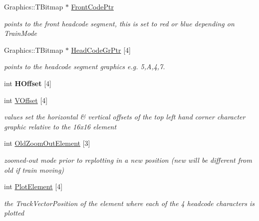 \begin{DoxyCompactItemize}
Graphics\+::\+T\+Bitmap $\ast$ \mbox{\hyperlink{class_t_train_a4ee3cdc7a3602f92a96084f8818b9bd3}{Front\+Code\+Ptr}}
\begin{DoxyCompactList}\small\item\em points to the front headcode segment, this is set to red or blue depending on Train\+Mode \end{DoxyCompactList}\item 
\mbox{\label{class_t_train_ac19e1d8b5171bace341f951bac1031e1}} 
Graphics\+::\+T\+Bitmap $\ast$ \mbox{\hyperlink{class_t_train_ac19e1d8b5171bace341f951bac1031e1}{Head\+Code\+Gr\+Ptr}} \mbox{[}4\mbox{]}
\begin{DoxyCompactList}\small\item\em points to the headcode segment graphics e.\+g. 5,A,4,7. \end{DoxyCompactList}\item 
\mbox{\label{class_t_train_a5b5409585a4af5224f1d91be6a405503}} 
int {\bfseries H\+Offset} \mbox{[}4\mbox{]}
\item 
int \mbox{\hyperlink{class_t_train_a4c8b153a620229a3d9cc54f64ffa5f4a}{V\+Offset}} \mbox{[}4\mbox{]}
\begin{DoxyCompactList}\small\item\em values set the horizontal \& vertical offsets of the top left hand corner character graphic relative to the 16x16 element \end{DoxyCompactList}\item 
int \mbox{\hyperlink{class_t_train_a29c7350be73eb11a6c018a4bc8f8099a}{Old\+Zoom\+Out\+Element}} \mbox{[}3\mbox{]}
\begin{DoxyCompactList}\small\item\em zoomed-\/out mode prior to replotting in a new position (new will be different from old if train moving) \end{DoxyCompactList}\item 
\mbox{\label{class_t_train_ac711fc0e209da47a98fd40def880f119}} 
int \mbox{\hyperlink{class_t_train_ac711fc0e209da47a98fd40def880f119}{Plot\+Element}} \mbox{[}4\mbox{]}
\begin{DoxyCompactList}\small\item\em the Track\+Vector\+Position of the element where each of the 4 headcode characters is plotted \end{DoxyCompactList}\item 

\end{DoxyCompactItemize}
